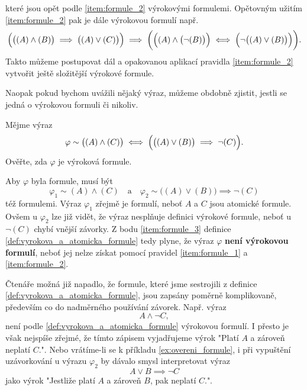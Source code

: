 které jsou opět podle \ref{item:formule_2} výrokovými formulemi. Opětovným užitím \ref{item:formule_2} pak je dále výrokovou formulí např.
\begin{equation*}
    \Bigl(\bigl((A) \land (B)\bigr) \implies \bigl((A) \lor (C)\bigr)\Bigr) \implies \bigg(\Bigl((A) \land \bigl(\neg(B)\bigr)\Bigr) \iff \Bigl(\neg\bigl((A) \lor (B)\bigr)\Bigr)\bigg).
\end{equation*}
Takto můžeme postupovat dál a opakovanou aplikací pravidla \ref{item:formule_2} vytvořit ještě složitější výrokové formule.\par
Naopak pokud bychom uvážili nějaký výraz, můžeme obdobně zjistit, jestli se jedná o výrokovou formuli či nikoliv.
\begin{example}\label{ex:overeni_formule}
    Mějme výraz
    \begin{equation*}
        \varphi\sim\bigl((A) \land (C)\bigr) \iff \Bigl(\bigl((A) \lor (B)\bigr) \implies \neg(C)\Bigr).
    \end{equation*}
    Ověřte, zda $\varphi$ je výroková formule.\par
    \begin{solution}
        Aby $\varphi$ byla formule, musí být
        \begin{equation*}
            \varphi_1\sim(A) \land (C)\quad\text{a}\quad\varphi_2\sim\bigl((A) \lor (B)\bigr) \implies \neg(C)
        \end{equation*}
        též formulemi. Výraz $\varphi_1$ zřejmě je formulí, neboť $A$ a $C$ jsou atomické formule. Ovšem u $\varphi_2$ lze již vidět, že výraz nesplňuje definici výrokové formule, neboť u $\neg(C)$ chybí vnější závorky. Z bodu \ref{item:formule_3} definice \ref{def:vyrokova_a_atomicka_formule} tedy plyne, že výraz $\varphi$ \textbf{není výrokovou formulí}, neboť jej nelze získat pomocí pravidel \ref{item:formule_1} a \ref{item:formule_2}.
    \end{solution}
\end{example}

Čtenáře možná již napadlo, že formule, které jsme sestrojili z definice \ref{def:vyrokova_a_atomicka_formule}, jsou zapsány poměrně komplikovaně, především co do nadměrného používání závorek. Např. výraz
\begin{equation}\label{eq:poradi_operaci}
    A \land \neg C,
\end{equation}
není podle \ref{def:vyrokova_a_atomicka_formule} výrokovou formulí. I přesto je však nejspíše zřejmé, že tímto zápisem vyjadřujeme výrok "Platí $A$ a zároveň neplatí $C$.". Nebo vrátíme-li se k příkladu \ref{ex:overeni_formule}, i při vypuštění uzávorkování u výrazu $\varphi_2$ by dávalo smysl interpretovat výraz
\begin{equation*}\label{eq:vypusteni_uzavorkovani}
    A \lor B \implies \neg C
\end{equation*}
jako výrok "Jestliže platí $A$ a zároveň $B$, pak neplatí $C$.".